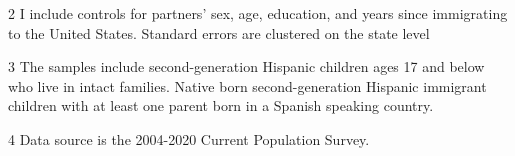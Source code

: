 \begin{table}[H]
\begin{threeparttable}
\begin{tablenotes}
\item[2] \footnotesize{I include controls for partners' sex, age, education, and years since immigrating to the United States.
                      Standard errors are clustered on the state level}
\item[3] \footnotesize{The samples include second-generation Hispanic children ages 17 and below who live in intact families. 
                      Native born second-generation Hispanic 
                      immigrant children with at least one parent born in a Spanish speaking 
                      country.}
\item[4] \footnotesize{Data source is the 2004-2020 Current Population Survey.}
\end{tablenotes}
\end{threeparttable}
\end{table}
